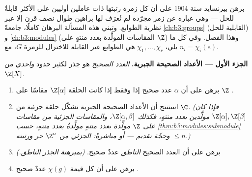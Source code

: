 \begin{problem}\label{pb:b3:representations:1}
برهن بيرنسايد سنة 1904 على أن كل زمرة رتبتها ذات عاملين أوليين
على الأكثر قابلةٌ للحل --- وهي عبارة عن زمر مجرّدة لم تُعرَف لها
براهين طوال نصف قرن إلا عبر نظرية الطوابع. وتبني هذه المسألة
البرهان كاملًا، جامعةً \cref{ch:b3:groups} (القابلية للحل) و \cref{ch:b3:modules}
(المقاسات المولَّدة بعدد منتهٍ على $\Z$) وهذا الفصل. وفي كل ما
يلي، $\chi_1, \dots, \chi_r$ هي الطوابع غير القابلة للاختزال للزمرة $G$، مع
$n_i = \chi_i(e)$.

\medskip
\noindent\textbf{الجزء الأول --- الأعداد الصحيحة الجبرية.}
\emph{العدد الصحيح } هو جذر لكثير حدود \emph{واحدي} من
$\Z[X]$.
\begin{enumerate}
  \item برهن على أن $\alpha$ عدد صحيح  إذا وفقط إذا كانت
        الحلقة $\Z[\alpha]$ مقاسًا على $\Z$ .
  \item استنتج أن الأعداد الصحيحة الجبرية تشكّل حلقة جزئية من
        $\C$. \emph{(فإذا كان $\Z[\alpha], \Z[\beta]$ مولَّدين بعدد منتهٍ، فكذلك
        $\Z[\alpha, \beta]$، والمقاسات الجزئية من مقاسات على $\Z$ مولَّدة
        بعدد منتهٍ مولَّدةٌ بعدد منتهٍ، حسب \cref{thm:b3:modules:submodule} وحجّة
        تقديم --- أو مباشرةً:  الجزئي من $\Z^n$ حر ورتبته
        $\leq n$.)}
  \item برهن على أن العدد الصحيح  \emph{الناطق} عددٌ صحيح.
        \emph{(بمبرهنة الجذر الناطق.)}
  \item برهن على أن كل قيمة  $\chi(g)$ عددٌ صحيح .
\end{enumerate}


\end{problem}
